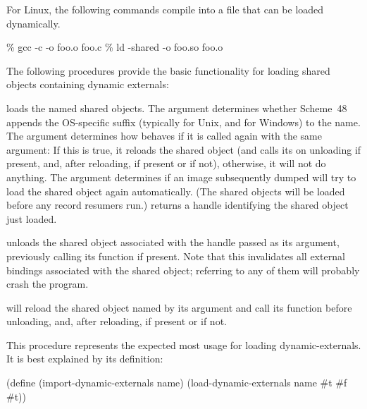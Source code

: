 For Linux, the following commands compile  into a file
 that can be loaded dynamically.
\begin{example}
\% gcc -c -o foo.o foo.c
\% ld -shared -o foo.so foo.o
\end{example}
%
The following procedures provide the basic functionality for loading
shared objects containing dynamic externals:
%
\begin{protos}
\end{protos}
%
 loads the named shared objects.  The
 argument determines whether Scheme~48 appends the
OS-specific suffix (typically  for Unix, and  for
Windows) to the name.  The   argument determines how
 behaves if it is called again with the
same argument: If this is true, it reloads the shared object (and
calls its  on unloading if present, and, after
reloading,  if present or 
if not), otherwise, it will not do anything.  The 
argument determines if an image subsequently dumped will try to load
the shared object again automatically.  (The shared objects will be
loaded before any record resumers run.)  
returns a handle identifying the shared object just loaded.

 unloads the shared object associated
with the handle passed as its argument, previously calling its
 function if present.  Note that this invalidates
all external bindings associated with the shared object; referring to
any of them will probably crash the program.

 will reload the shared object named by
its argument and call its  function before
unloading, and, after reloading,  if present or
 if not.

\begin{protos}
\end{protos}
%
This procedure represents the expected most usage for loading
dynamic-externals.  It is best explained by its definition:
%
\begin{example}
(define (import-dynamic-externals name)
  (load-dynamic-externals name #t #f #t))
\end{example}

